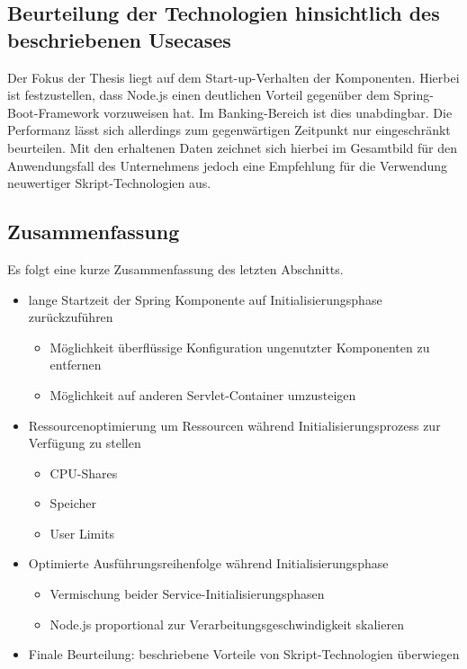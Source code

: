 \subsection{Beurteilung der Technologien hinsichtlich des beschriebenen Usecases}
Der Fokus der Thesis liegt auf dem Start-up-Verhalten der Komponenten. Hierbei ist festzustellen, dass Node.js einen deutlichen Vorteil gegenüber dem Spring-Boot-Framework vorzuweisen hat. Im Banking-Bereich ist dies unabdingbar. Die Performanz lässt sich allerdings zum gegenwärtigen Zeitpunkt nur eingeschränkt beurteilen. Mit den erhaltenen Daten zeichnet sich hierbei im Gesamtbild für den Anwendungsfall des Unternehmens jedoch eine Empfehlung für die Verwendung neuwertiger Skript-Technologien aus. 


\begin{minipage}{\textwidth}
\subsection{Zusammenfassung}

Es folgt eine kurze Zusammenfassung des letzten Abschnitts.

\begin{itemize}
	\item lange Startzeit der Spring Komponente auf Initialisierungsphase zurückzuführen
	\begin{itemize}
		\item Möglichkeit überflüssige Konfiguration ungenutzter Komponenten zu entfernen
		\item Möglichkeit auf anderen Servlet-Container umzusteigen
	\end{itemize}
	\item Ressourcenoptimierung um Ressourcen während Initialisierungsprozess zur Verfügung zu stellen
	\begin{itemize}
		\item CPU-Shares
		\item Speicher
		\item User Limits
	\end{itemize}
	\item Optimierte Ausführungsreihenfolge während Initialisierungsphase
	\begin{itemize}
		\item Vermischung beider Service-Initialisierungsphasen
		\item Node.js proportional zur Verarbeitungsgeschwindigkeit skalieren
	\end{itemize}
	\item Finale Beurteilung: beschriebene Vorteile von Skript-Technologien überwiegen
\end{itemize}
\end{minipage}

